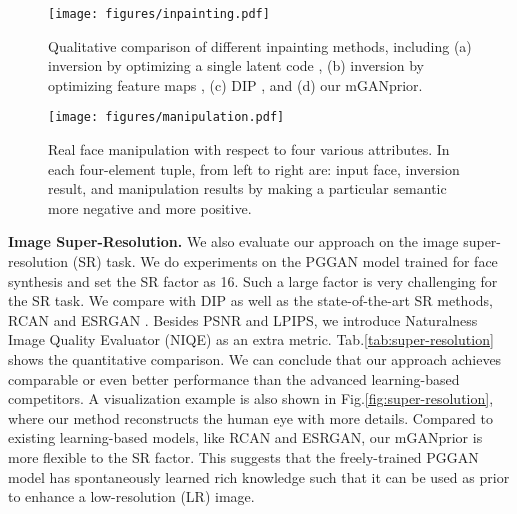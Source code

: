 \documentclass[10pt,twocolumn,letterpaper]{article}
\begin{document}
\begin{figure*}[t]
  \centering
  \texttt{[image: figures/inpainting.pdf]}
  \vspace{-8pt}
  \captionsetup{font=small}
  \caption{
    Qualitative comparison of different inpainting methods, including (a) inversion by optimizing a single latent code \cite{lipton2017precise,invertibility}, (b) inversion by optimizing feature maps \cite{bau2019semantic}, (c) DIP \cite{ulyanov2018deep}, and (d) our mGANprior.
  }
  \label{fig:inpainting}
 \vspace{-7pt}
\end{figure*}


\begin{figure*}[t]
  \centering
  \texttt{[image: figures/manipulation.pdf]}
  \vspace{-8pt}
  \captionsetup{font=small}
  \caption{
    Real face manipulation with respect to four various attributes. In each four-element tuple, from left to right are: input face, inversion result, and manipulation results by making a particular semantic more negative and more positive.
  }
  \label{fig:manipulation}
 \vspace{-15pt}
\end{figure*}


\vspace{2pt}\noindent\textbf{Image Super-Resolution.}
We also evaluate our approach on the image super-resolution (SR) task.
We do experiments on the PGGAN model trained for face synthesis and set the SR factor as 16.
Such a large factor is very challenging for the SR task.
We compare with DIP \cite{ulyanov2018deep} as well as the state-of-the-art SR methods, RCAN \cite{rcan} and ESRGAN \cite{wang2018esrgan}.
Besides PSNR and LPIPS, we introduce Naturalness Image Quality Evaluator (NIQE) \cite{niqe} as an extra metric.
Tab.\ref{tab:super-resolution} shows the quantitative comparison.
We can conclude that our approach achieves comparable or even better performance than the advanced learning-based competitors.
A visualization example is also shown in Fig.\ref{fig:super-resolution}, where our method reconstructs the human eye with more details.
Compared to existing learning-based models, like RCAN and ESRGAN, our mGANprior is more flexible to the SR factor.
This suggests that the freely-trained PGGAN model has spontaneously learned rich knowledge such that it can be used as prior to enhance a low-resolution (LR) image.
\end{document}
